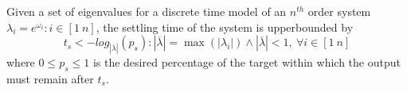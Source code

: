 \documentclass[sigconf]{llncs}
\begin{document}
\begin{theorem}
Given a set of eigenvalues for a discrete time model of an $n^{th}$ order system $\lambda_i =e^{\omega_i}: i \in [1\ n]$, the settling time of the system is upperbounded by
\begin{equation}
t_s<-log_{|\overline{\lambda}|}({p_s}) : |\overline{\lambda}| =\max(|\lambda_i|) \wedge |\overline{\lambda}|<1,\ \forall i \in [1\ n]
\label{eq:set_time}
\end{equation}
where $0\leq p_s \leq 1$ is the desired percentage of the target within which the output must remain after $t_s$.
\end{theorem}
\end{document}
